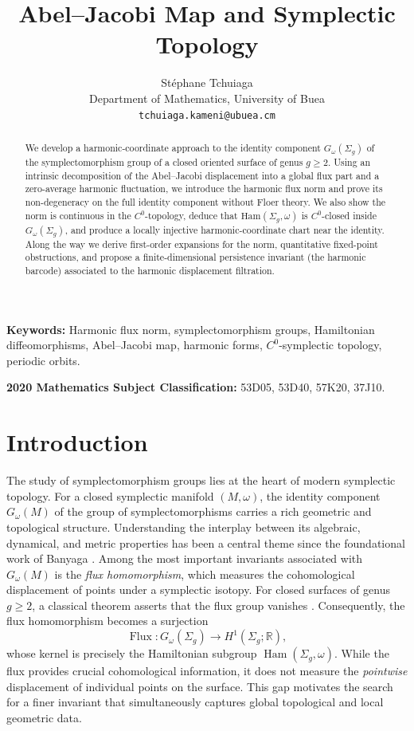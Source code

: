 \documentclass[11pt]{article}
\providecommand{\keywords}[1]{\textbf{Keywords:} #1}
\providecommand{\subjclass}[1]{\textbf{2020 Mathematics Subject Classification:} #1}
\theoremstyle{definition}
\begin{document}
	
	\title{Abel--Jacobi Map and Symplectic Topology}
	\author{St\'ephane Tchuiaga\\Department of Mathematics, University of Buea\\
		\texttt{tchuiaga.kameni@ubuea.cm}}
	\maketitle
	
	\begin{abstract}
		
		
		We develop a harmonic-coordinate approach to the identity component $G_\omega(\Sigma_g)$ of the symplectomorphism group of a closed oriented surface of genus $g\ge2$. Using an intrinsic decomposition of the Abel--Jacobi displacement into a global flux part and a zero-average harmonic fluctuation, we introduce the harmonic flux norm and prove its non-degeneracy on the full identity component without Floer theory. We also show the norm is continuous in the $C^0$-topology, deduce that $\mathrm{Ham}(\Sigma_g,\omega)$ is $C^0$-closed inside $G_\omega(\Sigma_g)$, and produce a locally injective harmonic-coordinate chart near the identity. Along the way we derive first-order expansions for the norm, quantitative fixed-point obstructions, and propose a finite-dimensional persistence invariant (the harmonic barcode) associated to the harmonic displacement filtration.
	\end{abstract}
	
	\keywords{Harmonic flux norm, symplectomorphism groups, Hamiltonian
		diffeomorphisms, Abel--Jacobi map, harmonic forms, $C^0$-symplectic topology,
		periodic orbits.}
	
	\subjclass{53D05, 53D40, 57K20, 37J10.}
	
	
	\section{Introduction}
	The study of symplectomorphism groups lies at the heart of modern symplectic topology. For a closed symplectic manifold $(M,\omega)$, the identity component $G_\omega(M)$ of the group of symplectomorphisms carries a rich geometric and topological structure. Understanding the interplay between its algebraic, dynamical, and metric properties has been a central theme since the foundational work of Banyaga \cite{Banyaga1997}. Among the most important invariants associated with $G_\omega(M)$ is the \emph{flux homomorphism}, which measures the cohomological displacement of points under a symplectic isotopy. For closed surfaces of genus $g\ge 2$, a classical theorem asserts that the flux group vanishes \cite{Banyaga1997}. Consequently, the flux homomorphism becomes a surjection
	\[
	\operatorname{Flux}: G_\omega(\Sigma_g) \longrightarrow H^1(\Sigma_g;\mathbb{R}),
	\]
	whose kernel is precisely the Hamiltonian subgroup $\operatorname{Ham}(\Sigma_g,\omega)$. While the flux provides crucial cohomological information, it does not measure the \emph{pointwise} displacement of individual points on the surface. This gap motivates the search for a finer invariant that simultaneously captures global topological and local geometric data.
	
\end{document}
